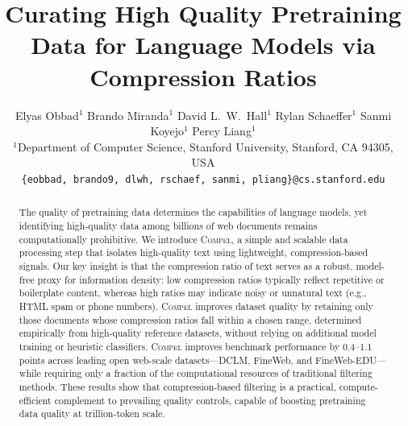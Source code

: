 \documentclass[twoside,11pt]{article}
\begin{document}
\title{Curating High Quality Pretraining Data for Language Models via Compression Ratios}

\author{%
  \name Elyas Obbad$^{1}$ \AND
  \name Brando Miranda$^{1}$ \AND
  \name David L.\ W.\ Hall$^{1}$ \AND
  \name Rylan Schaeffer$^{1}$ \AND
  \name Sanmi Koyejo$^{1}$ \AND
  \name Percy Liang$^{1}$ \\
  \addr $^{1}$Department of Computer Science, Stanford University, Stanford, CA 94305, USA \\
  \texttt{\{eobbad, brando9, dlwh, rschaef, sanmi, pliang\}@cs.stanford.edu}
}


\maketitle

\begin{abstract}
The quality of pretraining data determines the capabilities of language models, yet identifying high-quality data among billions of web documents remains computationally prohibitive.
We introduce \textsc{Compel}, a simple and scalable data processing step that isolates high-quality text using lightweight, compression-based signals.
Our key insight is that the compression ratio of text serves as a robust, model-free proxy for information density: low compression ratios typically reflect repetitive or boilerplate content, whereas high ratios may indicate noisy or unnatural text (e.g., HTML spam or phone numbers).
\textsc{Compel} improves dataset quality by retaining only those documents whose compression ratios fall within a chosen range, determined empirically from high-quality reference datasets, without relying on additional model training or heuristic classifiers.
\textsc{Compel} improves benchmark performance by 0.4--1.1 points across leading open web-scale datasets---DCLM, FineWeb, and FineWeb-EDU---while requiring only a fraction of the computational resources of traditional filtering methods.
These results show that compression-based filtering is a practical, compute-efficient complement to prevailing quality controls, capable of boosting pretraining data quality at trillion-token scale.
\end{abstract}
\end{document}
